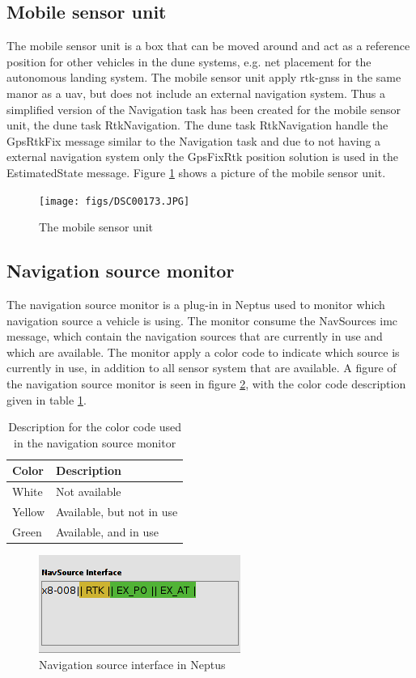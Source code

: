 \subsection{Mobile sensor unit}\label{ss:MobileSensor}
The mobile sensor unit is a box that can be moved around and act as a reference position for other vehicles in the \gls{dune} systems, e.g. net placement for the autonomous landing system. The mobile sensor unit apply \gls{rtk-gnss} in the same manor as a \gls{uav}, but does not include an external navigation system. Thus a simplified version of the Navigation task has been created for the mobile sensor unit, the \gls{dune} task RtkNavigation. The \gls{dune} task RtkNavigation handle the GpsRtkFix message similar to the Navigation task and due to not having a external navigation system only the GpsFixRtk position solution is used in the EstimatedState message. Figure \ref{Fig:MobileSensor} shows a picture of the mobile sensor unit.
\begin{figure}[H]
\centering
\texttt{[image: figs/DSC00173.JPG]}
\caption{The mobile sensor unit}
\label{Fig:MobileSensor}
\end{figure}
\subsection{Navigation source monitor}
The navigation source monitor is a plug-in in Neptus used to monitor which navigation source a vehicle is using. The monitor consume the NavSources \gls{imc} message, which contain the navigation sources that are currently in use and which are available. The monitor apply a color code to indicate which source is currently in use, in addition to all sensor system that are available. A figure of the navigation source monitor is seen in figure \ref{Fig:NavsourceInterface}, with the color code description given in table \ref{Tb:Color Code}.
\begin{table}[H]
\begin{center}
    \begin{tabular}{ | l | l |}
    \hline
    \textbf{Color} & \textbf{Description} \\ \hline
    White & Not available \\ \hline
    Yellow & Available, but not in use \\ \hline
    Green & Available, and in use \\ \hline
    \end{tabular}
\end{center}
\caption{Description for the color code used in the navigation source monitor}
\label{Tb:Color Code}
\end{table}
\begin{figure}[H]
\centering
\includegraphics[scale=0.6]{figs/NavSourceInterface.png}
\caption{Navigation source interface in Neptus}
\label{Fig:NavsourceInterface}
\end{figure}
